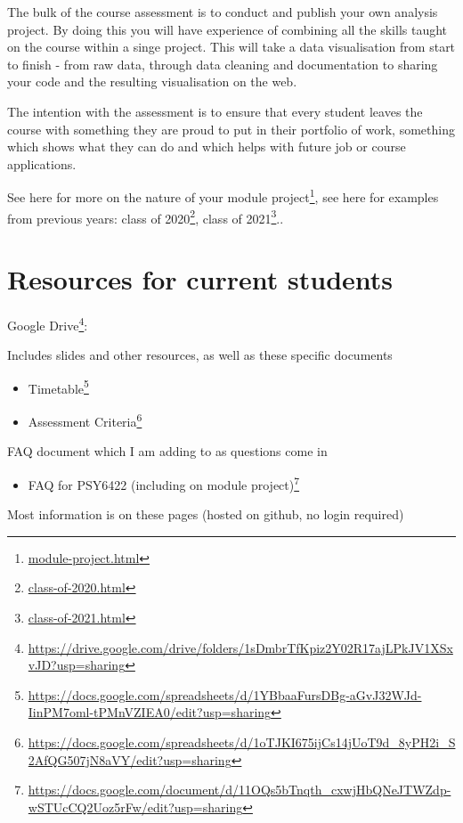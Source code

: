 \documentclass[
  12pt,
  a5paper,
]{book}
\DeclareRobustCommand{\href}[2]{#2\footnote{\url{#1}}}
\providecommand{\tightlist}{%
  \setlength{\itemsep}{0pt}\setlength{\parskip}{0pt}}
\begin{document}
The bulk of the course assessment is to conduct and publish your own analysis project. By doing this you will have experience of combining all the skills taught on the course within a singe project. This will take a data visualisation from start to finish - from raw data, through data cleaning and documentation to sharing your code and the resulting visualisation on the web.

The intention with the assessment is to ensure that every student leaves the course with something they are proud to put in their portfolio of work, something which shows what they can do and which helps with future job or course applications.

See here for \href{module-project.html}{more on the nature of your module project}, see here for examples from previous years: \href{class-of-2020.html}{class of 2020}, \href{class-of-2021.html}{class of 2021}..

\hypertarget{resources-for-current-students}{%
\section{Resources for current students}\label{resources-for-current-students}}

\href{https://drive.google.com/drive/folders/1sDmbrTfKpiz2Y02R17ajLPkJV1XSxvJD?usp=sharing}{Google Drive}:

Includes slides and other resources, as well as these specific documents

\begin{itemize}
\tightlist
\item
  \href{https://docs.google.com/spreadsheets/d/1YBbaaFursDBg-aGvJ32WJd-IinPM7oml-tPMnVZIEA0/edit?usp=sharing}{Timetable}
\item
  \href{https://docs.google.com/spreadsheets/d/1oTJKI675ijCs14jUoT9d_8yPH2i_S2AfQG507jN8aVY/edit?usp=sharing}{Assessment Criteria}
\end{itemize}

FAQ document which I am adding to as questions come in

\begin{itemize}
\tightlist
\item
  \href{https://docs.google.com/document/d/11OQs5bTnqth_cxwjHbQNeJTWZdp-wSTUcCQ2Uoz5rFw/edit?usp=sharing}{FAQ for PSY6422 (including on module project)}
\end{itemize}

Most information is on these pages (hosted on github, no login required)
\end{document}
